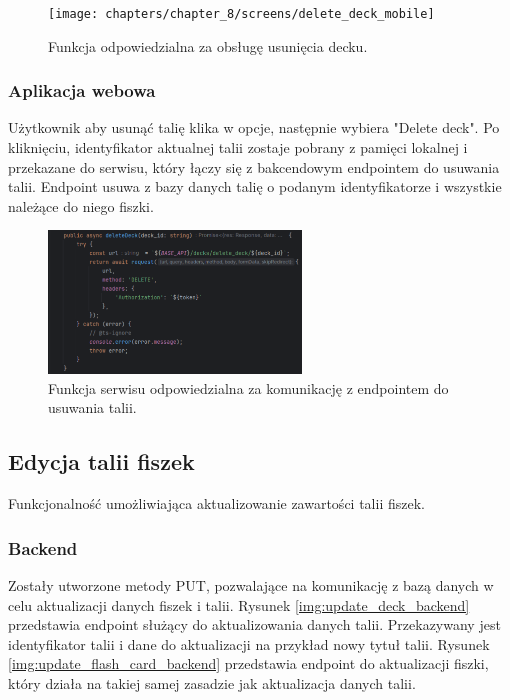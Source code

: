 \begin{figure}[H]
    \centering
    \texttt{[image: chapters/chapter\_8/screens/delete\_deck\_mobile]}
    \caption{Funkcja odpowiedzialna za obsługę usunięcia decku.}
    \label{img:delete_deck_mobile}
\end{figure}

\subsubsection{Aplikacja webowa}

Użytkownik aby usunąć talię klika w opcje, następnie wybiera "Delete deck". Po kliknięciu, identyfikator aktualnej talii zostaje pobrany z pamięci lokalnej i przekazane do serwisu, który łączy się z bakcendowym endpointem do usuwania talii. Endpoint usuwa z bazy danych talię o podanym identyfikatorze i wszystkie należące do niego fiszki.

\begin{figure}[H]
    \centering
    \includegraphics[width=0.6\textwidth]{chapters/chapter_8/screens/delete_deck_web}
    \caption{Funkcja serwisu odpowiedzialna za komunikację z endpointem do usuwania talii.}
    \label{img:delete_deck_web}
\end{figure}

\subsection{Edycja talii fiszek}

Funkcjonalność umożliwiająca aktualizowanie zawartości talii fiszek.

\subsubsection{Backend}

Zostały utworzone metody PUT, pozwalające na komunikację z bazą danych w celu aktualizacji danych fiszek i talii. Rysunek \ref{img:update_deck_backend} przedstawia endpoint służący do aktualizowania danych talii. Przekazywany jest identyfikator talii i dane do aktualizacji na przykład nowy tytuł talii. Rysunek \ref{img:update_flash_card_backend} przedstawia endpoint do aktualizacji fiszki, który działa na takiej samej zasadzie  jak aktualizacja danych talii.


